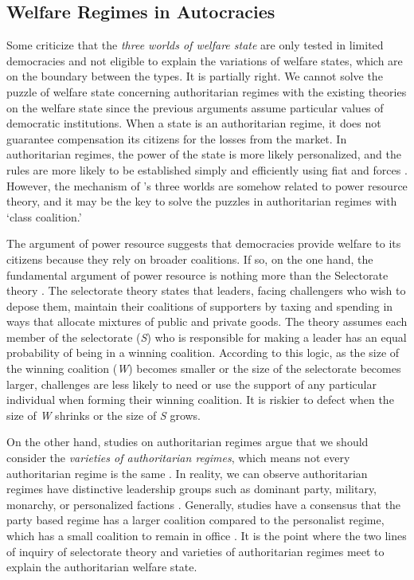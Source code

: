 \documentclass[11pt]{article}
\begin{document}
\subsection{Welfare Regimes in Autocracies}

Some criticize that the \textit{three worlds of welfare state} are only tested in limited democracies and not eligible to explain the variations of welfare states, which are on the boundary between the types. It is partially right. We cannot solve the puzzle of welfare state concerning authoritarian regimes with the existing theories on the welfare state since the previous arguments assume particular values of democratic institutions. When a state is an authoritarian regime, it does not guarantee compensation its citizens for the losses from the market. In authoritarian regimes, the power of the state is more likely personalized, and the rules are more likely to be established simply and efficiently using fiat and forces \citep[4]{Gerring2012}. However, the mechanism of \citet{Gosta1990}'s three worlds are somehow related to power resource theory, and it may be the key to solve the puzzles in authoritarian regimes with `class coalition.' \par

The argument of power resource suggests that democracies provide welfare to its citizens because they rely on broader coalitions. If so, on the one hand, the fundamental argument of power resource is nothing more than the Selectorate theory \citep{BDM1999, BuenodeMesquita2003}. The selectorate theory states that leaders, facing challengers who wish to depose them, maintain their coalitions of supporters by taxing and spending in ways that allocate mixtures of public and private goods. The theory assumes each member of the selectorate (\textit{S}) who is responsible for making a leader has an equal probability of being in a  winning coalition. According to this logic, as the size of the winning coalition (\textit{W}) becomes smaller or the size of the selectorate becomes larger, challenges are less likely to need or use the support of any particular individual when forming their winning coalition. It is riskier to defect when the size of \textit{W} shrinks or the size of \textit{S} grows.\par 

On the other hand, studies on authoritarian regimes argue that we should consider the \textit{varieties of authoritarian regimes}, which means not every authoritarian regime is the same \citep{Geddes1999, Geddes2014, Cheibub2010, Wahman2013, Roller2013, Soest2015}. In reality, we can observe authoritarian regimes have distinctive leadership groups such as dominant party, military, monarchy, or personalized factions \citep{Geddes2014}. Generally, studies have a consensus that the party based regime has a larger coalition compared to the personalist regime, which has a small coalition to remain in office \citep{Levitsky2002, Levitsky2010a, Gandhi2009}. It is the point where the two lines of inquiry of selectorate theory and varieties of authoritarian regimes meet to explain the authoritarian welfare state.\par
\end{document}
